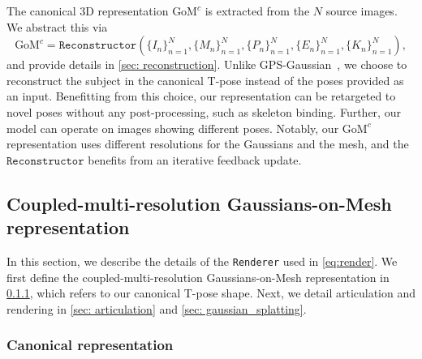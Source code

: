 The canonical 3D representation $\text{GoM}^c$ is extracted from the $N$ source images. We abstract this via
    \begin{equation}
        \text{GoM}^c = \texttt{Reconstructor}(\{I_n\}_{n=1}^N, \{M_n\}_{n=1}^N, \{P_n\}_{n=1}^N, \{E_n\}_{n=1}^N, \{K_n\}_{n=1}^N), 
        \label{eq:reconstructor}
    \end{equation}
and provide details in \cref{sec: reconstruction}. Unlike GPS-Gaussian~\citep{zheng2024gpsgaussian}, we choose to reconstruct the subject in the canonical T-pose instead of the poses provided as an input. Benefitting from this choice, our representation can be retargeted to novel poses without any post-processing, such as skeleton binding. Further, our model can operate on images showing different poses. Notably, our $\text{GoM}^c$ representation uses different resolutions for the Gaussians and the mesh, and the $\texttt{Reconstructor}$ benefits from an iterative feedback update. %

\subsection{Coupled-multi-resolution Gaussians-on-Mesh representation}
\label{sec: rendering}
In this section, we describe the details of the \texttt{Renderer} used in  \cref{eq:render}. We first define the coupled-multi-resolution Gaussians-on-Mesh representation in \cref{sec: canonical_rep}, which refers to our canonical T-pose shape. Next, we detail  articulation and rendering in \cref{sec: articulation} and \cref{sec: gaussian_splatting}.

\subsubsection{Canonical representation}
\label{sec: canonical_rep}


